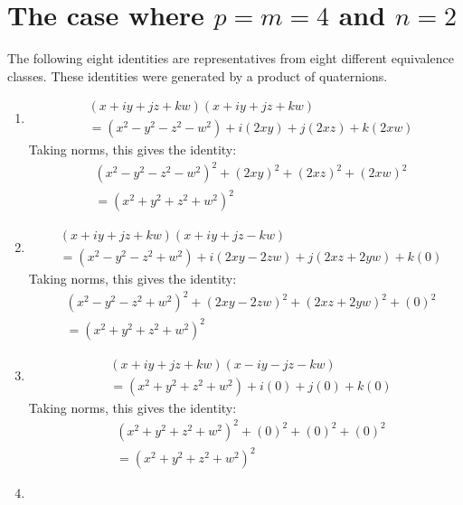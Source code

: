 \documentclass[12pt]{article}
\theoremstyle{definition}
\numberwithin{equation}{section}
\begin{document}
\section{The case where \(p = m = 4\) and \(n = 2\)}








The following eight identities are representatives from 
eight different equivalence classes. These identities
were generated by a product of quaternions. 

\begin{enumerate}[{Identity} I:]
\item
    \begin{align*}
    &(x + iy + jz + kw)(x + iy + jz + kw) \\
    &= (x^2 - y^2 - z^2 - w^2 ) + i(2xy) + j(2xz) + k(2xw) 
    \end{align*}
Taking norms, this gives the identity:
    \begin{align*}
    &(x^2 - y^2 - z^2 - w^2 )^2 + (2xy)^2 + (2xz)^2 + (2xw)^2 \\
    &= (x^2 + y^2 + z^2 + w^2)^2
    \end{align*}
\item
    \begin{align*}
    &(x + iy + jz + kw)(x + iy + jz - kw) \\
    &= (x^2 - y^2 - z^2 + w^2 ) + i(2xy - 2zw) + j(2xz + 2yw) + k(0) 
    \end{align*}
Taking norms, this gives the identity:
    \begin{align*}
    &(x^2 - y^2 - z^2 + w^2 )^2 + (2xy - 2zw)^2 + (2xz + 2yw)^2 + (0)^2\\ 
    &= (x^2 + y^2 + z^2 + w^2)^2
    \end{align*}
\item
    \begin{align*}
    &(x + iy + jz + kw)(x - iy - jz - kw) \\
    &= (x^2 + y^2 + z^2 + w^2 ) + i(0) + j(0) + k(0) 
    \end{align*}
Taking norms, this gives the identity:
    \begin{align*}
    &(x^2 + y^2 + z^2 + w^2 )^2 + (0)^2 + (0)^2 + (0)^2 \\
    &= (x^2 + y^2 + z^2 + w^2)^2
    \end{align*}
\item

\end{enumerate}
\end{document}
